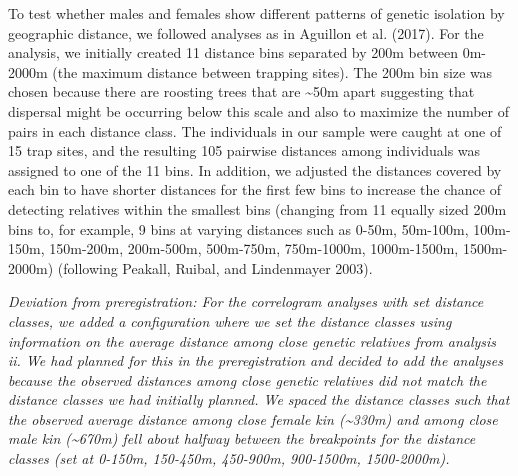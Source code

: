 \documentclass[
]{article}
\begin{document}
To test whether males and females show different patterns of genetic
isolation by geographic distance, we followed analyses as in Aguillon et
al. (2017). For the analysis, we initially created 11 distance bins
separated by 200m between 0m-2000m (the maximum distance between
trapping sites). The 200m bin size was chosen because there are roosting
trees that are \textasciitilde50m apart suggesting that dispersal might
be occurring below this scale and also to maximize the number of pairs
in each distance class. The individuals in our sample were caught at one
of 15 trap sites, and the resulting 105 pairwise distances among
individuals was assigned to one of the 11 bins. In addition, we adjusted
the distances covered by each bin to have shorter distances for the
first few bins to increase the chance of detecting relatives within the
smallest bins (changing from 11 equally sized 200m bins to, for example,
9 bins at varying distances such as 0-50m, 50m-100m, 100m-150m,
150m-200m, 200m-500m, 500m-750m, 750m-1000m, 1000m-1500m, 1500m-2000m)
(following Peakall, Ruibal, and Lindenmayer 2003).

\emph{Deviation from preregistration: For the correlogram analyses with
set distance classes, we added a configuration where we set the distance
classes using information on the average distance among close genetic
relatives from analysis ii. We had planned for this in the
preregistration and decided to add the analyses because the observed
distances among close genetic relatives did not match the distance
classes we had initially planned. We spaced the distance classes such
that the observed average distance among close female kin
(\textasciitilde330m) and among close male kin (\textasciitilde670m)
fell about halfway between the breakpoints for the distance classes (set
at 0-150m, 150-450m, 450-900m, 900-1500m, 1500-2000m).}
\end{document}
